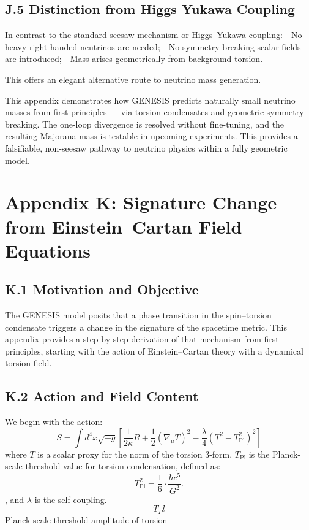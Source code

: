 \documentclass{article}
\begin{document}
\subsection*{J.5 Distinction from Higgs Yukawa Coupling}
In contrast to the standard seesaw mechanism or Higgs–Yukawa coupling:
- No heavy right-handed neutrinos are needed;
- No symmetry-breaking scalar fields are introduced;
- Mass arises geometrically from background torsion.

This offers an elegant alternative route to neutrino mass generation.

\begin{tcolorbox}[colback=gray!5, colframe=black!30, title=Why this matters]
This appendix demonstrates how GENESIS predicts naturally small neutrino masses from first principles — via torsion condensates and geometric symmetry breaking. The one-loop divergence is resolved without fine-tuning, and the resulting Majorana mass is testable in upcoming experiments. This provides a falsifiable, non-seesaw pathway to neutrino physics within a fully geometric model.
\end{tcolorbox}


\section*{Appendix K: Signature Change from Einstein–Cartan Field Equations}
\label{app:signature-change}


\subsection*{K.1 Motivation and Objective}
The GENESIS model posits that a phase transition in the spin--torsion condensate triggers a change in the signature of the spacetime metric. This appendix provides a step-by-step derivation of that mechanism from first principles, starting with the action of Einstein--Cartan theory with a dynamical torsion field.

\subsection*{K.2 Action and Field Content}
We begin with the action:
\begin{equation}
S = \int d^4x \sqrt{-g} \left[ \frac{1}{2\kappa} R + \frac{1}{2} (\nabla_\mu T)^2 - \frac{\lambda}{4}(T^2 - T_{\mathrm{Pl}}^2)^2 \right]
\end{equation}
where $T$ is a scalar proxy for the norm of the torsion 3-form, \( T_{\mathrm{Pl}} \) is the Planck-scale threshold value for torsion condensation, defined as:
\[
T_{\mathrm{Pl}}^2 = \frac{1}{6} \cdot \frac{\hbar c^5}{G^2}.
\]
, and $\lambda$ is the self-coupling.
 \begin{equation}T_Pl\end{equation} Planck-scale threshold amplitude of torsion
\end{document}
